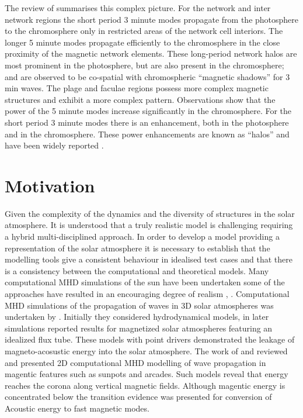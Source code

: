 \documentclass[twocolumn]{aastex62}
\begin{document}
The review of \citet{Khomenko2013} summarises this complex picture. For the network and inter network regions the short period 3 minute modes propagate from the photosphere to the chromosphere only in restricted areas of the network cell interiors. The longer 5 minute modes propagate efficiently to the chromosphere in the close proximity of the magnetic network elements. These long-period network halos are most prominent in the photosphere, but are also present in the chromosphere; and are observed to be co-spatial with chromospheric “magnetic shadows” for 3 min waves. The plage and faculae regions possess more complex magnetic structures and exhibit a more complex pattern.  Observations show that the power of the 5 minute modes increase significantly in the chromosphere. For the short period  3 minute modes there is an enhancement, both in the photosphere and in the chromosphere. These power enhancements are known as “halos” and have been widely reported \cite{Kontogiannis2010}. 

\section{Motivation} \label{sec:motivation}

Given the complexity of the dynamics and the diversity of structures in the solar atmosphere. It is understood that a truly realistic model is challenging requiring a hybrid multi-disciplined approach. In order to develop a model providing a representation of the solar atmosphere it is necessary to establish that the modelling tools give a consistent behaviour in idealised test cases and that there is a consistency between the computational and theoretical models. Many computational MHD simulations of the sun have been undertaken some of the approaches have resulted in an encouraging degree of realism  \citet{Vogler2005}, \citet{Gudiksen2011}. Computational MHD simulations of the propagation of waves in 3D solar atmospheres was undertaken by \citet{Fedun2009}. Initially they considered hydrodynamical models, in later simulations \citet{Fedun2011} \citet{Vigeesh2012} reported results for magnetized solar atmospheres featuring an idealized flux tube. These models with point drivers demonstrated the leakage of magneto-acosustic energy into the solar atmosphere. The work of \citet{Khomenko2013} and  \citet{Santamaria2015} reviewed and presented 2D computational MHD modelling of wave propagation in magentic features such as sunpots and arcades. Such models reveal that energy reaches the corona along vertical magnetic fields. Although magentic energy is concentrated below the transition evidence was presented for conversion of Acoustic energy to fast magnetic modes.
\end{document}

